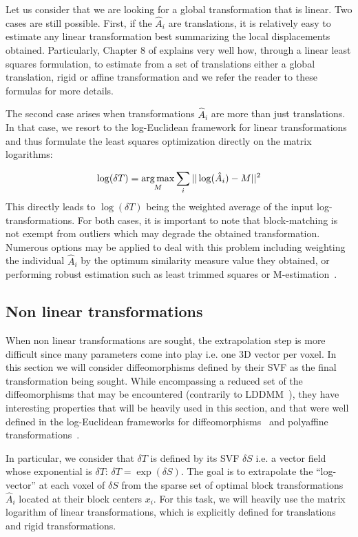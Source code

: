 \documentclass[a4paper]{article}
\def\argmax{\operatornamewithlimits{arg\,max}}
\begin{document}
Let us consider that we are looking for a global transformation that is linear. Two cases are still possible. First, if the $\hat{A}_i$ are translations, it is relatively easy to estimate any linear transformation best summarizing the local displacements obtained. Particularly, Chapter 8 of \cite{Pennec_PhD_1996} explains very well how, through a linear least squares formulation, to estimate from a set of translations either a global translation, rigid or affine transformation and we refer the reader to these formulas for more details.

The second case arises when transformations $\hat{A}_i$ are more than just translations. In that case, we resort to the log-Euclidean framework for linear transformations~\cite{arsigny:inria-00616084} and thus formulate the least squares optimization directly on the matrix logarithms:

\begin{equation}
	\log(\delta T) = \argmax_{M} \sum_i || \log(\hat{A}_i) - M ||^2
\end{equation}
This directly leads to $\log(\delta T)$ being the weighted average of the input log-transformations. For both cases, it is important to note that block-matching is not exempt from outliers which may degrade the obtained transformation. Numerous options may be applied to deal with this problem including weighting the individual $\hat{A}_i$ by the optimum similarity measure value they obtained, or performing robust estimation such as least trimmed squares or M-estimation~\cite{Rousseeuw_Book_1987}.

\subsection{Non linear transformations}
\label{sub:non-linear-extrapolation}

When non linear transformations are sought, the extrapolation step is more difficult since many parameters come into play i.e. one 3D vector per voxel. In this section we will consider diffeomorphisms defined by their SVF as the final transformation being sought. While encompassing a reduced set of the diffeomorphisms that may be encountered (contrarily to LDDMM~\cite{Beg_IJCV_2005}), they have interesting properties that will be heavily used in this section, and that were well defined in the log-Euclidean frameworks for diffeomorphisms~\cite{arsigny:inria-00615594} and polyaffine transformations~\cite{arsigny:inria-00616084}.

In particular, we consider that $\delta T$ is defined by its SVF $\delta S$ i.e. a vector field whose exponential is $\delta T$: $\delta T = \exp(\delta S)$. The goal is to extrapolate the ``log-vector'' at each voxel of $\delta S$ from the sparse set of optimal block transformations $\hat{A}_i$ located at their block centers $x_i$. For this task, we will heavily use the matrix logarithm of linear transformations, which is explicitly defined for translations and rigid transformations.
\end{document}
